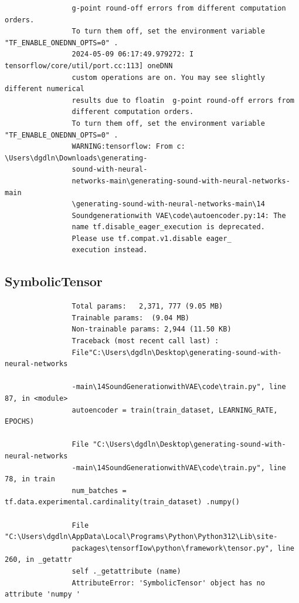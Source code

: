 \documentclass[12pt, a4paper]{article}
\begin{document}
\begin{verbatim}
				g-point round-off errors from different computation orders.
				To turn them off, set the environment variable "TF_ENABLE_ONEDNN_OPTS=0" . 
				2024-05-09 06:17:49.979272: I tensorflow/core/util/port.cc:113] oneDNN 
				custom operations are on. You may see slightly different numerical 
				results due to floatin 	g-point round-off errors from 
				different computation orders. 
				To turn them off, set the environment variable "TF_ENABLE_ONEDNN_OPTS=0" . 
				WARNING:tensorflow: From c: \Users\dgdln\Downloads\generating-
				sound-with-neural-
				networks-main\generating-sound-with-neural-networks-main
				\generating-sound-with-neural-networks-main\14
				Soundgenerationwith VAE\code\autoencoder.py:14: The 
				name tf.disable_eager_execution is deprecated.
				Please use tf.compat.v1.disable eager_ 
				execution instead.
			\end{verbatim}
			
			\subsection{SymbolicTensor}
			\begin{verbatim}
				Total params:	2,371, 777 (9.05 MB)
				Trainable params:  (9.04 MB)
				Non-trainable params: 2,944 (11.50 KB)
				Traceback (most recent call last) :
				File"C:\Users\dgdln\Desktop\generating-sound-with-neural-networks
				
				-main\14SoundGenerationwithVAE\code\train.py", line 87, in <module>
				autoencoder = train(train_dataset, LEARNING_RATE, EPOCHS)
				
				File "C:\Users\dgdln\Desktop\generating-sound-with-neural-networks
				-main\14SoundGenerationwithVAE\code\train.py", line 78, in train
				num_batches = tf.data.experimental.cardinality(train_dataset) .numpy()
				
				File "C:\Users\dgdln\AppData\Local\Programs\Python\Python312\Lib\site-
				packages\tensorfIow\python\framework\tensor.py", line 260, in _getattr
				self ._getattribute (name)
				AttributeError: 'SymbolicTensor' object has no attribute 'numpy '
			\end{verbatim}
			

			
\end{document}
